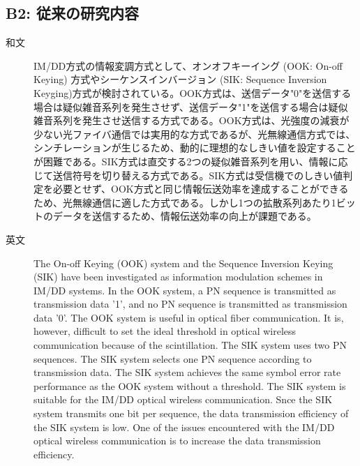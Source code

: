 ﻿\documentclass[a4j,10pt]{jarticle}
\begin{document}
\subsection{B2: 従来の研究内容} %
\begin{description}
 \item[和文]  IM/DD方式の情報変調方式として、オンオフキーイング (OOK: On-off Keying) 方式\cite{ook}\cite{scinti}やシーケンスインバージョン (SIK: Sequence Inversion Keyging)方式\cite{sik1}\cite{sik2}が検討されている。OOK方式は、送信データ"0"を送信する場合は疑似雑音系列を発生させず、送信データ"1"を送信する場合は疑似雑音系列を発生させ送信する方式である。OOK方式は、光強度の減衰が少ない光ファイバ通信では実用的な方式であるが、光無線通信方式では、シンチレーションが生じるため\cite{scinti}、動的に理想的なしきい値を設定することが困難である。SIK方式は直交する2つの疑似雑音系列を用い、情報に応じて送信符号を切り替える方式である。SIK方式は受信機でのしきい値判定を必要とせず、OOK方式と同じ情報伝送効率を達成することができるため、光無線通信に適した方式である。しかし1つの拡散系列あたり1ビットのデータを送信するため、情報伝送効率の向上が課題である。
%
 \item[英文] The On-off Keying (OOK) system \cite{ook}\cite{scinti} and the Sequence Inversion Keying (SIK) \cite{sik1}\cite{sik2} have been investigated as information modulation schemes in IM/DD systems. In the OOK system, a PN sequence is transmitted as transmission data '1', and no PN sequence is transmitted as transmission data '0'. The OOK system is useful in optical fiber communication. It is, however, difficult to set the ideal threshold in optical wireless communication because of the scintillation. The SIK system uses two PN sequences. The SIK system selects one PN sequence according to transmission data. The SIK system achieves the same symbol error rate performance as the OOK system without a threshold. The SIK system is suitable for the IM/DD optical wireless communication. Snce the SIK system transmits one bit per sequence, the data transmission efficiency of the SIK system is low. One of the issues encountered with the IM/DD optical wireless communication is to increase the data transmission efficiency. 
\end{description}
%
\end{document}
